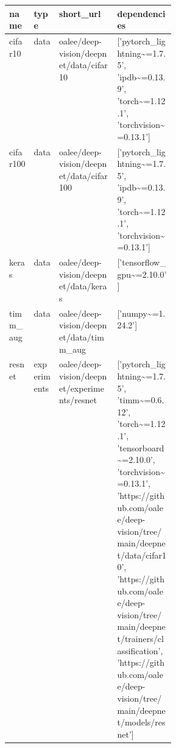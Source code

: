 \begin{figure}[H]
    \centering

\begin{tabular}{|l|l|l|p{0.35\linewidth}|}
\hline
 name           & type        & short\_url                                          & dependencies                                                                                                                                                                                                                                                                                                                             \\
\hline
 cifar10        & data        & oalee/deep-vision/deepnet/data/cifar10             & ['pytorch\_lightning\textasciitilde{}=1.7.5', 'ipdb\textasciitilde{}=0.13.9', 'torch\textasciitilde{}=1.12.1', 'torchvision\textasciitilde{}=0.13.1']                                                                                                                                                                                                                                                         \\ 
  \hline 
 
 cifar100       & data        & oalee/deep-vision/deepnet/data/cifar100            & ['pytorch\_lightning\textasciitilde{}=1.7.5', 'ipdb\textasciitilde{}=0.13.9', 'torch\textasciitilde{}=1.12.1', 'torchvision\textasciitilde{}=0.13.1']                                                                                                                                                                                                                                                         \\
  \hline 
 keras          & data        & oalee/deep-vision/deepnet/data/keras               & ['tensorflow\_gpu\textasciitilde{}=2.10.0']                                                                                                                                                                                                                                                                                                                   \\
  \hline 
 timm\_aug       & data        & oalee/deep-vision/deepnet/data/timm\_aug            & ['numpy\textasciitilde{}=1.24.2']                                                                                                                                                                                                                                                                                                                            \\
  \hline 
 resnet         & experiments & oalee/deep-vision/deepnet/experiments/resnet       & ['pytorch\_lightning\textasciitilde{}=1.7.5', 'timm\textasciitilde{}=0.6.12', 'torch\textasciitilde{}=1.12.1', 'tensorboard\textasciitilde{}=2.10.0', 'torchvision\textasciitilde{}=0.13.1', 'https://github.com/oalee/deep-vision/tree/main/deepnet/data/cifar10', 'https://github.com/oalee/deep-vision/tree/main/deepnet/trainers/classification', 'https://github.com/oalee/deep-vision/tree/main/deepnet/models/resnet'] \\
 

\end{tabular}
\end{figure}
